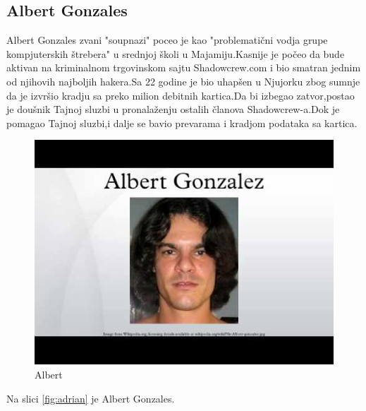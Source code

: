 \documentclass[a4paper]{article}
\begin{document}
\subsection{Albert Gonzales}
Albert Gonzales zvani "soupnazi" poceo je kao "problematični vodja grupe kompjuterskih štrebera" u srednjoj školi u Majamiju.Kasnije je počeo da bude aktivan na kriminalnom trgovinskom sajtu Shadowcrew.com i bio smatran jednim od njihovih najboljih hakera.Sa 22 godine je bio uhapšen u Njujorku zbog sumnje da je izvršio kradju sa preko milion debitnih kartica.Da bi izbegao zatvor,postao je doušnik Tajnoj sluzbi u pronalaženju ostalih članova Shadowcrew-a.Dok je pomagao Tajnoj sluzbi,i dalje se bavio prevarama i kradjom podataka sa kartica.
\begin{figure}[h!]
	\begin{center}
		\includegraphics[scale=0.25]{albert.jpg}
	\end{center}
	\caption{Albert}
	\label{fig:albert}
\end{figure}

Na slici \ref{fig:adrian} je Albert Gonzales.
\end{document}
